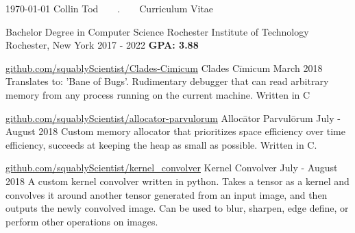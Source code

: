 \documentclass{awesome-cv}
\begin{document}
	\makecvheader[C]

	\makecvfooter
		{\today}
		{Collin Tod~~~~.~~~~Curriculum Vitae}
		{}

		\begin{cventries}
			\cventry
				{Bachelor Degree in Computer Science}
				{Rochester Institute of Technology}
				{Rochester, New York}
				{2017 - 2022}
                {\textbf{GPA: 3.88}}
		\end{cventries}

	\cvsection{PROJECTS}
		\begin{cventries}
			\cventry
				{\href{https://github.com/squablyScientist/Clades-Cimicum}{github.com/squablyScientist/Clades-Cimicum}}
				{Clades Cīmicum}
				{March 2018}
				{}
				{Translates to: 'Bane of Bugs'. Rudimentary debugger that can read arbitrary memory from any process running on the current machine. Written in C}

			\cventry
				{\href{https://github.com/squablyScientist/allocator-parvulorum}{github.com/squablyScientist/allocator-parvulorum}}
				{Allocātor Parvulōrum}
				{July - August 2018}
				{}
				{Custom memory allocator that prioritizes space efficiency over time efficiency, succeeds at keeping the heap as small as possible. Written in C.}

            \cventry
                {\href{https://github.com/squablyScientist/kernel_convolver}{github.com/squablyScientist/kernel\_convolver}}
                {Kernel Convolver}
                {July - August 2018}
                {}
                {A custom kernel convolver written in python. Takes a tensor as a kernel and convolves it around another tensor generated from an input image, and then outputs the newly convolved image. Can be used to blur, sharpen, edge define, or perform other operations on images.}


		\end{cventries}
\end{document}
